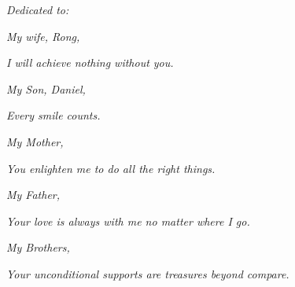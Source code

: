 \textit{Dedicated to:}

\indent\indent \textit{My wife, Rong,}

\indent\indent\indent \textit{I will achieve nothing without you.}
 
\indent\indent \textit{My Son, Daniel,}

\indent\indent\indent \textit{Every smile counts.}

\indent\indent \textit{My Mother,}

\indent\indent\indent \textit{You enlighten me to do all the right things.}

\indent\indent \textit{My Father,}

\indent\indent\indent \textit{Your love is always with me no matter where I go.}

\indent\indent \textit{My Brothers,}

\indent\indent\indent \textit{Your unconditional supports are treasures beyond compare.}
